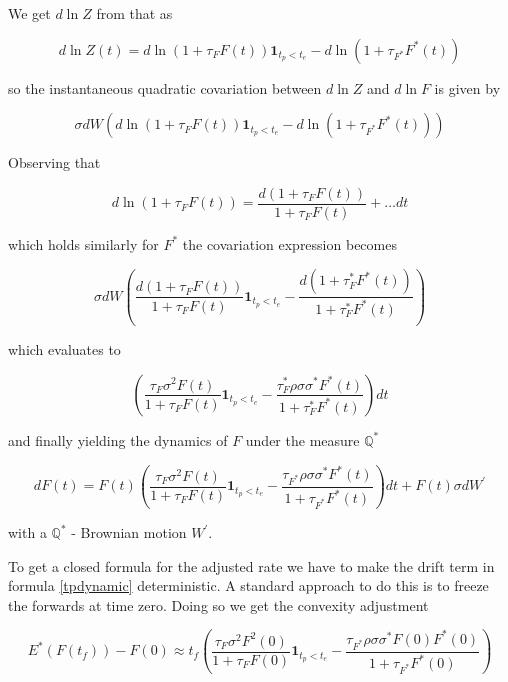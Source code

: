 \documentclass{amsart}
\theoremstyle{plain}
\numberwithin{equation}{section}
\begin{document}
We get $d\ln{Z}$ from that as

\begin{equation}
d\ln{Z(t)} = d\ln{(1+\tau_F F(t))}\textbf{1}_{t_p < t_e} - d\ln{(1+\tau_{F^*} F^*(t))}
\end{equation}

so the instantaneous quadratic covariation between $d\ln{Z}$ and $d\ln{F}$ is given by

\begin{equation}
\sigma dW (d\ln{(1+\tau_F F(t))}\textbf{1}_{t_p < t_e} - d\ln{(1+\tau_{F^*} F^*(t))})
\end{equation}

Observing that

\begin{equation}
d\ln(1+\tau_F F(t)) = \frac{d(1+\tau_F F(t))}{1+\tau_F F(t)} + \ldots dt
\end{equation}

which holds similarly for $F^*$ the covariation expression becomes

\begin{equation}
\sigma dW \left( \frac{d(1+\tau_F F(t))}{1+\tau_F F(t)}\textbf{1}_{t_p < t_e} - \frac{d(1+\tau_F^* F^*(t))}{1+\tau_F^* F^*(t)} \right) 
\end{equation}

which evaluates to

\begin{equation}
\left(\frac{\tau_F \sigma^2 F(t)}{1+\tau_F F(t)} \textbf{1}_{t_p<t_e} - \frac{\tau_F^* \rho\sigma\sigma^* F^*(t)}{1+\tau_F^* F^*(t)}\right) dt
\end{equation}

and finally yielding the dynamics of $F$ under the measure $\mathbb{Q}^*$

\begin{equation}\label{tpdynamic}
dF(t) = F(t) \left(\frac{\tau_F \sigma^2 F(t)}{1+\tau_F F(t)} \textbf{1}_{t_p<t_e} - \frac{\tau_{F^*} \rho\sigma\sigma^* F^*(t)}{1+\tau_{F^*} F^*(t)}\right) dt + F(t) \sigma dW^\prime
\end{equation}

with a $\mathbb{Q^*}$ - Brownian motion $W^\prime$.

To get a closed formula for the adjusted rate we have to make the drift term in formula \ref{tpdynamic} deterministic. A standard approach to do this
is to freeze the forwards at time zero. Doing so we get the convexity adjustment

\begin{equation}
E^*(F(t_f)) - F(0) \approx t_f \left(\frac{\tau_F \sigma^2 F^2(0)}{1+\tau_F F(0)} \textbf{1}_{t_p<t_e} - \frac{\tau_{F^*} \rho\sigma\sigma^*F(0) F^*(0)}{1+\tau_{F^*} F^*(0)}\right)
\end{equation}
\end{document}
